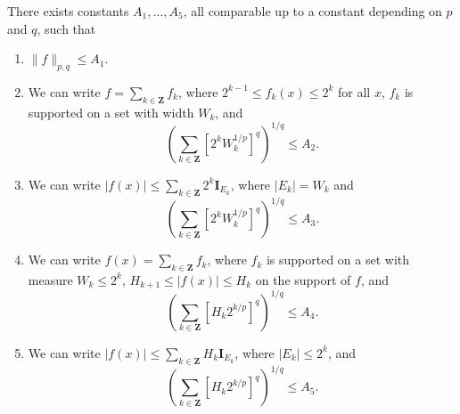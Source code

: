 \begin{theorem}
    There exists constants $A_1, \dots, A_5$, all comparable up to a constant depending on $p$ and $q$, such that
    \begin{enumerate}
        \item \label{onebound} $\| f \|_{p,q} \leq A_1$.

        \item \label{twobound} We can write $f = \sum_{k \in \mathbf{Z}} f_k$, where $2^{k-1} \leq f_k(x) \leq 2^k$ for all $x$, $f_k$ is supported on a set with width $W_k$, and
        \[ \left( \sum_{k \in \mathbf{Z}} [2^{k} W_k^{1/p}]^q \right)^{1/q} \leq A_2. \]

        \item \label{threebound} We can write $|f(x)| \leq \sum_{k \in \mathbf{Z}} 2^k \mathbf{I}_{E_k}$, where $|E_k| = W_k$ and
        \[ \left( \sum_{k \in \mathbf{Z}} [2^{k} W_k^{1/p}]^q \right)^{1/q} \leq A_3. \]

        \item \label{fourbound} We can write $f(x) = \sum_{k \in \mathbf{Z}} f_k$, where $f_k$ is supported on a set with measure $W_k \leq 2^k$, $H_{k+1} \leq |f(x)| \leq H_k$ on the support of $f$, and
        \[ \left( \sum_{k \in \mathbf{Z}} [H_k 2^{k/p}]^q \right)^{1/q} \leq A_4. \]

        \item \label{fivebound} We can write $|f(x)| \leq \sum_{k \in \mathbf{Z}} H_k \mathbf{I}_{E_k}$, where $|E_k| \leq 2^k$, and
        \[ \left( \sum_{k \in \mathbf{Z}} [H_k 2^{k/p}]^q \right)^{1/q} \leq A_5. \]
    \end{enumerate}
\end{theorem}
